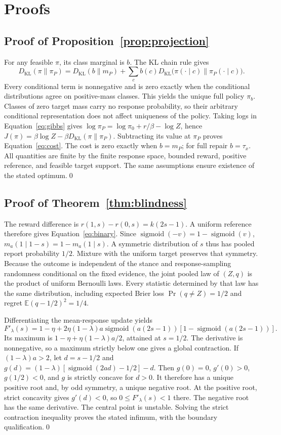 \documentclass[10pt]{article}
\newcommand{\E}{\mathbb E}
\newcommand{\KL}{D_{\mathrm{KL}}}
\newcommand{\sig}{\operatorname{sigmoid}}
\begin{document}
\section{Proofs}\label{app:proofs}
\subsection{Proof of Proposition~\ref{prop:projection}}
For any feasible $\pi$, its class marginal is $b$. The KL chain rule gives
\begin{equation}
 \KL(\pi\|\pi_P)=\KL(b\|m_P)+
   \sum_c b(c)\KL\big(\pi(\cdot\mid c)\|\pi_P(\cdot\mid c)\big).
\end{equation}
Every conditional term is nonnegative and is zero exactly when the
conditional distributions agree on positive-mass classes. This yields the
unique full policy $\pi_b$. Classes of zero target mass carry no response
probability, so their arbitrary conditional representation does not affect
uniqueness of the policy. Taking logs in Equation~\eqref{eq:gibbs} gives
$\log\pi_P=\log\pi_0+r/\beta-\log Z$, hence
$J(\pi)=\beta\log Z-\beta\KL(\pi\|\pi_P)$. Subtracting its value at
$\pi_P$ proves Equation~\eqref{eq:cost}. The cost is zero exactly when
$b=m_P$; for full repair $b=\tau_x$. All quantities are finite by the
finite response space, bounded reward, positive reference, and feasible
target support. The same assumptions ensure existence of the stated optimum.\qed

\subsection{Proof of Theorem~\ref{thm:blindness}}
The reward difference is
$r(1,s)-r(0,s)=k(2s-1)$. A uniform reference therefore gives
Equation~\eqref{eq:binary}. Since $\sig(-v)=1-\sig(v)$,
$m_a(1\mid1-s)=1-m_a(1\mid s)$. A symmetric distribution of $s$ thus
has pooled report probability $1/2$. Mixture with the uniform target
preserves that symmetry. Because the outcome is independent of the stance and response-sampling
randomness conditional on the fixed evidence, the joint pooled law of $(Z,q)$ is the
product of uniform Bernoulli laws. Every statistic determined by that law
has the same distribution, including expected Brier loss
$\Pr(q\ne Z)=1/2$ and regret $\E(q-1/2)^2=1/4$.

Differentiating the mean-response update yields
\begin{equation}
 F'_\lambda(s)=1-\eta+
 2\eta(1-\lambda)a\sig(a(2s-1))[1-\sig(a(2s-1))].
\end{equation}
Its maximum is $1-\eta+\eta(1-\lambda)a/2$, attained at $s=1/2$.
The derivative is nonnegative, so a maximum strictly below one gives a
global contraction. If $(1-\lambda)a>2$, let
$d=s-1/2$ and
$g(d)=(1-\lambda)[\sig(2ad)-1/2]-d$.
Then $g(0)=0$, $g'(0)>0$, $g(1/2)<0$, and $g$ is strictly concave for
$d>0$. It therefore has a unique positive root and, by odd symmetry, a
unique negative root. At the positive root, strict concavity gives
$g'(d)<0$, so $0\le F'_\lambda(s)<1$ there. The negative root has the
same derivative. The central point is unstable. Solving the strict
contraction inequality proves the stated infimum, with the boundary
qualification.\qed
\end{document}
